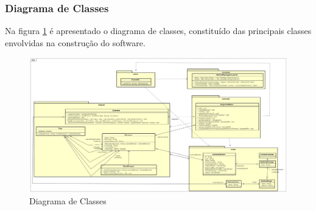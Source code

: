 \subsubsection{Diagrama de Classes}\label{subsection:classes}

Na figura \ref{figura:diagramaclasses} é apresentado o diagrama de classes, constituído das principais classes envolvidas na construção do software.

\begin{figure}[!htb]
	\caption{Diagrama de Classes}
	\label{figura:diagramaclasses}
	\centering
	\includegraphics[width=1\textwidth]{img/ferramenta_diagrama_classes.png}
\end{figure}



